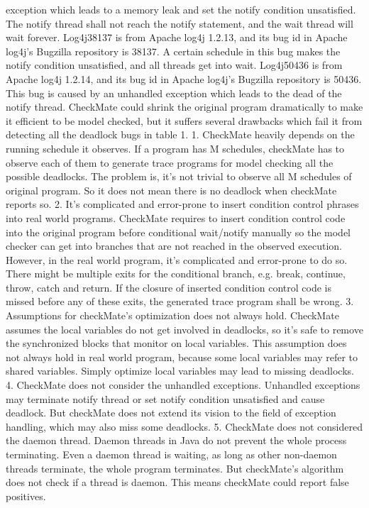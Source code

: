 \documentclass{sigplanconf}
\begin{document}
 exception which leads to a memory leak and set the notify condition unsatisfied. The notify thread shall not reach the notify statement, and the wait thread will wait forever.
Log4j38137 is from Apache log4j 1.2.13, and its bug id in Apache log4j’s Bugzilla repository is 38137. A certain schedule in this bug makes the notify condition unsatisfied, and all threads get into wait.
Log4j50436 is from Apache log4j 1.2.14, and its bug id in Apache log4j’s Bugzilla repository is 50436. This bug is caused by an unhandled exception which leads to the dead of the notify thread.
CheckMate could shrink the original program dramatically to make it efficient to be model checked, but it suffers several drawbacks which fail it from detecting all the deadlock bugs in table 1.
1.	CheckMate heavily depends on the running schedule it observes. If a program has M schedules, checkMate has to observe each of them to generate trace programs for model checking all the possible deadlocks. The problem is, it’s not trivial to observe all M schedules of original program. So it does not mean there is no deadlock when checkMate reports so.
2.	It’s complicated and error-prone to insert condition control phrases into real world programs. CheckMate requires to insert condition control code into the original program before conditional wait/notify manually so the model checker can get into branches that are not reached in the observed execution. However, in the real world program, it’s complicated and error-prone to do so. There might be multiple exits for the conditional branch, e.g. break, continue, throw, catch and return. If the closure of inserted condition control code is missed before any of these exits, the generated trace program shall be wrong.
3.	Assumptions for checkMate’s optimization does not always hold. CheckMate assumes the local variables do not get involved in deadlocks, so it’s safe to remove the synchronized blocks that monitor on local variables. This assumption does not always hold in real world program, because some local variables may refer to shared variables. Simply optimize local variables may lead to missing deadlocks.
4.	CheckMate does not consider the unhandled exceptions. Unhandled exceptions may terminate notify thread or set notify condition unsatisfied and cause deadlock. But checkMate does not extend its vision to the field of exception handling, which may also miss some deadlocks.
5.	CheckMate does not considered the daemon thread. Daemon threads in Java do not prevent the whole process terminating. Even a daemon thread is waiting, as long as other non-daemon threads terminate, the whole program terminates. But checkMate’s algorithm does not check if a thread is daemon. This means checkMate could report false positives.
\end{document}
